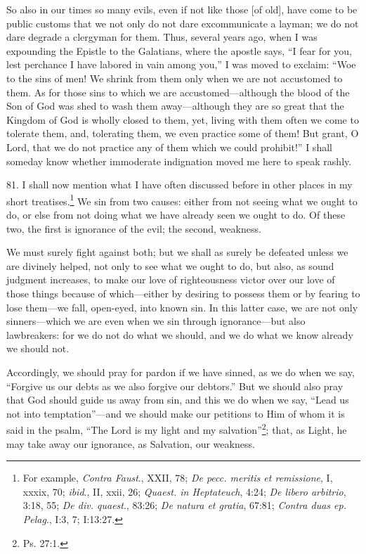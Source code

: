 So also in our times so many evils, even if not like those [of old], have come to be public customs that we not only do not dare excommunicate a layman; we do not dare degrade a clergyman for them. Thus, several years ago, when I was expounding the Epistle to the Galatians, where the apostle says, ``I fear for you, lest perchance I have labored in vain among you,'' I was moved to exclaim: ``Woe to the sins of men! We shrink from them only when we are not accustomed to them. As for those sins to which we are accustomed—although the blood of the Son of God was shed to wash them away—although they are so great that the Kingdom of God is wholly closed to them, yet, living with them often we come to tolerate them, and, tolerating them, we even practice some of them! But grant, O Lord, that we do not practice any of them which we could prohibit!'' I shall someday know whether immoderate indignation moved me here to speak rashly.


81. I shall now mention what I have often discussed before in other places in my short treatises.\footnote{For example, \emph{Contra Faust}., XXII, 78; \emph{De pecc. meritis et remissione}, I, xxxix, 70; \emph{ibid}., II, xxii, 26; \emph{Quaest. in Heptateuch}, 4:24; \emph{De libero arbitrio}, 3:18, 55; \emph{De div. quaest}., 83:26; \emph{De natura et gratia}, 67:81; \emph{Contra duas ep. Pelag}., I:3, 7; I:13:27.} We sin from two causes: either from not seeing what we ought to do, or else from not doing what we have already seen we ought to do. Of these two, the first is ignorance of the evil; the second, weakness.

We must surely fight against both; but we shall as surely be defeated unless we are divinely helped, not only to see what we ought to do, but also, as sound judgment increases, to make our love of righteousness victor over our love of those things because of which—either by desiring to possess them or by fearing to lose them—we fall, open-eyed, into known sin. In this latter case, we are not only sinners—which we are even when we sin through ignorance—but also lawbreakers: for we do not do what we should, and we do what we know already we should not.

Accordingly, we should pray for pardon if we have sinned, as we do when we say, ``Forgive us our debts as we also forgive our debtors.'' But we should also pray that God should guide us away from sin, and this we do when we say, ``Lead us not into temptation''—and we should make our petitions to Him of whom it is said in the psalm, ``The Lord is my light and my salvation''\footnote{Ps. 27:1.}; that, as Light, he may take away our ignorance, as Salvation, our weakness.


